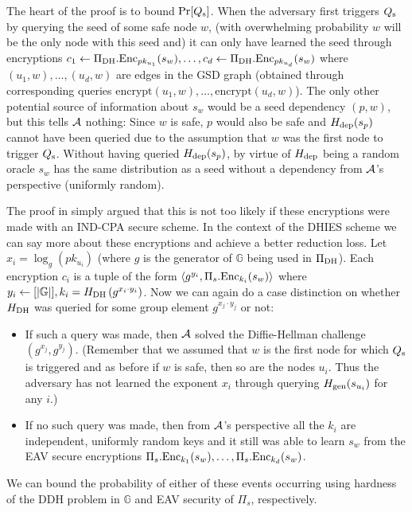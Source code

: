 The heart of the proof is to bound $\pr{\qs}$. When the adversary first triggers $Q_\mathrm{s}$ by querying the seed of some safe node $w$, (with overwhelming probability $w$ will be the only node with this seed and) it can only have learned the seed through encryptions
$c_1 \leftarrow \Pi_{\mathrm{DH}}.\mathrm{Enc}_{pk_{u_1}}(s_w), \ldots, c_d \leftarrow \Pi_{\mathrm{DH}}.\mathrm{Enc}_{pk_{u_d}}(s_w)$
where $(u_1, w), \ldots, (u_d, w)$ are edges in the GSD graph (obtained through corresponding queries $\mathrm{encrypt}(u_1, w), \ldots, \mathrm{encrypt}(u_d, w)$). The only other potential source of information about $s_w$ would be a seed dependency $(p, w)$, but this tells $\mathcal{A}$ nothing: Since $w$ is safe, $p$ would also be safe and $H_\mathrm{dep}(s_p)$ cannot have been queried due to the assumption that $w$ was the first node to trigger $Q_\mathrm{s}$. Without having queried $H_\mathrm{dep}(s_p)$, by virtue of $H_\mathrm{dep}$ being a random oracle $s_w$ has the same distribution as a seed without a dependency from $\mathcal{A}$'s perspective (uniformly random).


The proof in \cite{ttkem} simply argued that this is not too likely if these encryptions were made with an IND-CPA secure scheme. In the context of the DHIES scheme we can say more about these encryptions and achieve a better reduction loss.
Let $x_i = \log_g(pk_{u_i})$ (where $g$ is the generator of $\mathbb{G}$ being used in $\Pi_{\mathrm{DH}}$). Each encryption $c_i$ is a tuple of the form $\langle g^{y_i}, \Pi_s.\mathrm{Enc}_{k_i}(s_w) \rangle$ where $y_i \leftarrow [\lvert\mathbb{G}\rvert], k_i = H_\mathrm{DH}\left(g^{x_i \cdot y_i}\right)$. Now we can again do a case distinction on whether $H_\mathrm{DH}$ was queried for some group element $g^{x_j \cdot y_j}$ or not:
\begin{itemize}
	\item If such a query was made, then $\mathcal{A}$ solved the Diffie-Hellman challenge $(g^{x_j}, g^{y_j})$. (Remember that we assumed that $w$ is the first node for which $Q_\mathrm{s}$ is triggered and as before if $w$ is safe, then so are the nodes $u_i$. Thus the adversary has not learned the exponent $x_i$ through querying $H_\mathrm{gen}(s_{u_i})$ for any $i$.)
	\item If no such query was made, then from $\mathcal{A}$'s perspective all the $k_i$ are independent, uniformly random keys and it still was able to learn $s_w$ from the EAV secure encryptions $\Pi_s.\mathrm{Enc}_{k_1}(s_w), \ldots, \Pi_s.\mathrm{Enc}_{k_d}(s_w)$.
\end{itemize}
We can bound the probability of either of these events occurring using hardness of the DDH problem in $\mathbb{G}$ and EAV security of $\Pi_s$, respectively.

